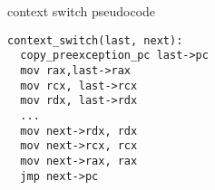 
\begin{frame}[fragile,label=ctxtSwitchPseudo]{context switch pseudocode}
\begin{lstlisting}
context_switch(last, next):
  copy_preexception_pc last->pc
  mov rax,last->rax 
  mov rcx, last->rcx 
  mov rdx, last->rdx
  ...
  mov next->rdx, rdx
  mov next->rcx, rcx
  mov next->rax, rax
  jmp next->pc
\end{lstlisting}
\end{frame}
